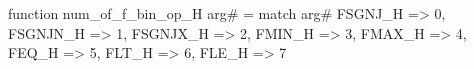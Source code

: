 function num_of_f_bin_op_H arg# = match arg# {
  FSGNJ_H => 0,
  FSGNJN_H => 1,
  FSGNJX_H => 2,
  FMIN_H => 3,
  FMAX_H => 4,
  FEQ_H => 5,
  FLT_H => 6,
  FLE_H => 7
}
